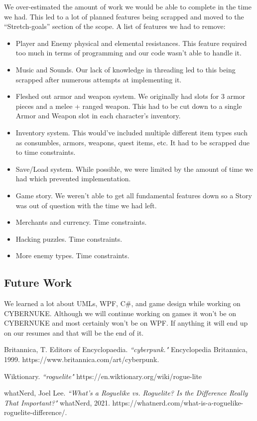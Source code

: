 \documentclass[10pt,conference,onecolumn,compsoc]{IEEEtran}
\begin{document}
We over-estimated the amount of work we would be able to complete in the time we had. This led to a lot of planned features being scrapped and moved to the “Stretch-goals” section of the scope.
A list of features we had to remove:
\begin{itemize}
	\item Player and Enemy physical and elemental resistances. This feature required too much in terms of programming and our code wasn't able to handle it.
	\item Music and Sounds. Our lack of knowledge in threading led to this being scrapped after numerous attempts at implementing it.
	\item Fleshed out armor and weapon system. We originally had slots for 3 armor pieces and a melee + ranged weapon. This had to be cut down to a single Armor and Weapon slot in each character's inventory.
	\item Inventory system. This would've included multiple different item types such as consumbles, armors, weapons, quest items, etc. It had to be scrapped due to time constraints.
	\item Save/Load system. While possible, we were limited by the amount of time we had which prevented implementation.
	\item Game story. We weren't able to get all fundamental features down so a Story was out of question with the time we had left.
	\item Merchants and currency. Time constraints.
	\item Hacking puzzles. Time constraints.
	\item More enemy types. Time constraints.
\end{itemize}

\subsection{Future Work}
We learned a lot about UMLs, WPF, C\#, and game design while working on CYBERNUKE. Although we will continue working on games it won't be on CYBERNUKE and most certainly won't be on WPF. If anything it will end up on our resumes and that will be the end of it.





\begin{thebibliography}{1}

Britannica, T. Editors of Encyclopaedia. \emph{``cyberpunk."} Encyclopedia Britannica, 1999. https://www.britannica.com/art/cyberpunk.

Wiktionary. \emph{``roguelite"}
https://en.wiktionary.org/wiki/rogue-lite

whatNerd, Joel Lee. \emph{``What’s a Roguelike vs. Roguelite? Is the Difference Really That Important?"} whatNerd, 2021. https://whatnerd.com/what-is-a-roguelike-roguelite-difference/.

\end{thebibliography}

\end{document}
